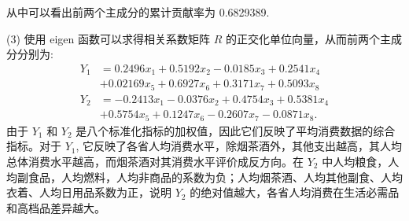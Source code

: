 \documentclass{ctexrep}
\begin{document}
从中可以看出前两个主成分的累计贡献率为 0.6829389.

(3) 使用 eigen 函数可以求得相关系数矩阵 $R$ 的正交化单位向量，从而前两个主成分分别为:
\begin{equation*}
\begin{aligned}
Y_1&=0.2496x_1+0.5192x_2-0.0185x_3+0.2541x_4 \\
&+0.02169x_5+0.6927x_6+0.3171x_7+0.5093x_8 \\
Y_2&=-0.2413x_1-0.0376x_2+0.4754x_3+0.5381x_4 \\
&+0.5754x_5+0.1247x_6-0.2607x_7-0.0871x_8.
\end{aligned}
\end{equation*}
由于 $Y_1$ 和 $Y_2$ 是八个标准化指标的加权值，因此它们反映了平均消费数据的综合指标。对于 $Y_1$, 它反映了各省人均消费水平，除烟茶酒外，其他支出越高，其人均总体消费水平越高，而烟茶酒对其消费水平评价成反方向。在 $Y_2$ 中人均粮食，人均副食品，人均燃料，人均非商品的系数为负；人均烟茶酒、人均其他副食、人均衣着、人均日用品系数为正，说明 $Y_2$ 的绝对值越大，各省人均消费在生活必需品和高档品差异越大。
\end{document}
